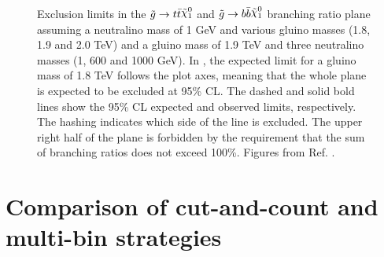 \begin{figure}[htbp]
	\centering
	\caption{Exclusion limits in the $\gluino \to t \bar{t} \ninoone$ and $\gluino \to b \bar{b} \ninoone$
		branching ratio plane assuming  a neutralino mass of 1 GeV and various gluino masses 
		(1.8, 1.9 and 2.0 TeV) and  a gluino mass of 1.9 TeV and three neutralino masses (1, 600 and 1000 GeV). 
		In , the expected limit for a gluino mass of 1.8 TeV follows the plot axes, meaning that the whole plane is 
		expected to be excluded at 95\% CL.
		The dashed and solid bold lines show the 95\% CL expected and observed limits, respectively. The hashing indicates which side of the line 
		is excluded. The upper right half of the plane is forbidden by the requirement that the sum of branching ratios does not exceed 100\%.
		    Figures from Ref. \cite{Aaboud:2017hrg}.}
\end{figure}

\FloatBarrier

\section{Comparison of cut-and-count and multi-bin strategies}

